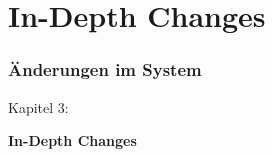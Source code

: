 %

\section{In-Depth Changes}
\begin{frame}[fragile]
	\frametitle{Änderungen im System}

	\begin{center}\huge{Kapitel 3:}\end{center}
	\begin{center}\huge{\color{typo3darkgrey}\textbf{In-Depth Changes}}\end{center}

\end{frame}


